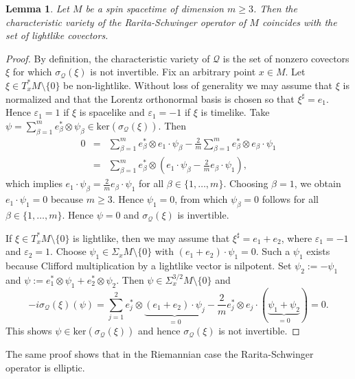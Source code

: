 \documentclass[a4paper,11pt]{amsart}
\newtheorem{lemma}[thm]{Lemma}
\theoremstyle{definition}
\begin{document}
\begin{lemma}\label{l:RSnotdef}
Let $M$ be a spin spacetime of dimension $m\ge 3$.
Then the characteristic variety of the Rarita-Schwinger operator of $M$ coincides with the set of lightlike covectors.
\end{lemma}

\begin{proof}
By definition, the characteristic variety of ${\mathcal{Q}}$ is the set of nonzero co\-vectors $\xi$ for which $\sigma_{\mathcal{Q}}(\xi)$ is not invertible.
Fix an arbitrary point $x\in M$.
Let $\xi\in T_x^*M\setminus\{0\}$ be non-lightlike.
Without loss of generality we may assume that $\xi$ is normalized and that the Lorentz orthonormal basis is chosen so that $\xi^\sharp=e_1$.
Hence ${\varepsilon}_1=1$ if $\xi$ is spacelike and ${\varepsilon}_1=-1$ if $\xi$ is timelike.
Take $\psi=\sum_{\beta=1}^me_\beta^*\otimes\psi_\beta\in\mathrm{ker}(\sigma_{\mathcal{Q}}(\xi))$.
Then
\begin{eqnarray*} 
0&=&\sum_{\beta=1}^me_\beta^*\otimes e_1\cdot\psi_\beta-\frac{2}{m}\sum_{\beta=1}^me_\beta^*\otimes e_\beta\cdot\psi_1\\
&=&\sum_{\beta=1}^me_\beta^*\otimes (e_1\cdot\psi_\beta-\frac{2}{m}e_\beta\cdot\psi_1),
\end{eqnarray*}
which implies $e_1\cdot\psi_\beta=\frac{2}{m}e_\beta\cdot\psi_1$ for all $\beta\in\{1,\ldots,m\}$.
Choosing $\beta=1$, we obtain $e_1\cdot\psi_1=0$ because $m\geq 3$.
Hence $\psi_1=0$, from which $\psi_\beta=0$ follows for all $\beta\in\{1,\ldots,m\}$.
Hence $\psi=0$ and $\sigma_{\mathcal{Q}}(\xi)$ is invertible.

If $\xi\in T_x^*M\setminus\{0\}$ is lightlike, then we may assume that $\xi^\sharp=e_1+e_2$, where ${\varepsilon}_1=-1$ and ${\varepsilon}_2=1$.
Choose $\psi_1\in\Sigma_xM\setminus\{0\}$ with $(e_1+e_2)\cdot\psi_1=0$.
Such a $\psi_1$ exists because Clifford multiplication by a lightlike vector is nilpotent.
Set $\psi_2:=-\psi_1$ and $\psi:=e_1^*\otimes\psi_1+e_2^*\otimes\psi_2$.
Then $\psi\in \Sigma^{3/2}_xM\setminus\{0\}$ and
\[
-i\sigma_{\mathcal{Q}}(\xi)(\psi)=\sum_{j=1}^2e_j^*\otimes \underbrace{(e_1+e_2)\cdot\psi_j}_{=0}-\frac{2}{m}e_j^*\otimes e_j\cdot(\underbrace{\psi_1+\psi_2}_{=0})
=0.
\]
This shows $\psi\in\mathrm{ker}(\sigma_{\mathcal{Q}}(\xi))$ and hence $\sigma_{\mathcal{Q}}(\xi)$ is not invertible.
\end{proof}

The same proof shows that in the Riemannian case the Rarita-Schwinger operator is elliptic.
\end{document}
